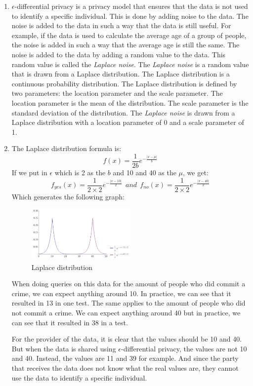 \documentclass[twoside, a4paper, fleqn, reqno]{article}
\begin{document}
\begin{enumerate}
	\item $\epsilon$-differential privacy is a privacy model that ensures that the data is not used to identify a specific individual. This is done by adding noise to the data.
	The noise is added to the data in such a way that the data is still useful.
	For example, if the data is used to calculate the average age of a group of people, the noise is added in such a way that the average age is still the same.
	The noise is added to the data by adding a random value to the data. This random value is called the \textit{Laplace noise}.
	The \textit{Laplace noise} is a random value that is drawn from a Laplace distribution. The Laplace distribution is a continuous probability distribution.
	The Laplace distribution is defined by two parameters: the location parameter and the scale parameter.
	The location parameter is the mean of the distribution. The scale parameter is the standard deviation of the distribution.
	The \textit{Laplace noise} is drawn from a Laplace distribution with a location parameter of 0 and a scale parameter of 1.
	\item The Laplace distribution formula is:
	\begin{equation}
		f(x) = \frac{1}{2b}e^{-\frac{|x-\mu|}{b}}
	\end{equation}
	If we put in $\epsilon$ which is 2 as the $b$ and 10 and 40 as the $\mu$, we get:
	\begin{equation}
		f_{yes}(x) = \frac{1}{2\times2}e^{-\frac{|x-10|}{2}} ~~and~~ f_{no}(x) = \frac{1}{2\times2}e^{-\frac{|x-40|}{2}}
	\end{equation}
	Which generates the following graph:
	\begin{figure}[H]
		\centering
		\includegraphics[width=0.5\textwidth]{./media/laplace.png}
		\caption{Laplace distribution}
		\label{fig:laplace}
	\end{figure}
	When doing queries on this data for the amount of people who did commit a crime,
	we can expect anything around 10. In practice, we can see that it resulted in 13 in one test.
	The same applies to the amount of people who did not commit a crime. We can expect anything around 40
	but in practice, we can see that it resulted in 38 in a test.

	For the provider of the data, it is clear that the values should be 10 and 40.
	But when the data is shared using $\epsilon$-differential privacy, the values are not 10 and 40.
	Instead, the values are 11 and 39 for example. And since the party that receives the data
	does not know what the real values are, they cannot use the data to identify a specific individual.

\end{enumerate}
\end{document}
